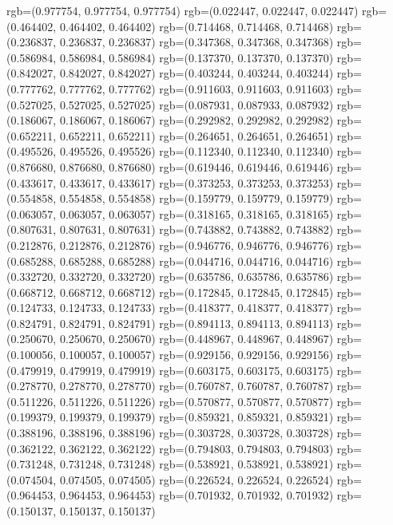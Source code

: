 {{{					rgb=(0.977754, 0.977754, 0.977754)
					rgb=(0.022447, 0.022447, 0.022447)
					rgb=(0.464402, 0.464402, 0.464402)
					rgb=(0.714468, 0.714468, 0.714468)
					rgb=(0.236837, 0.236837, 0.236837)
					rgb=(0.347368, 0.347368, 0.347368)
					rgb=(0.586984, 0.586984, 0.586984)
					rgb=(0.137370, 0.137370, 0.137370)
					rgb=(0.842027, 0.842027, 0.842027)
					rgb=(0.403244, 0.403244, 0.403244)
					rgb=(0.777762, 0.777762, 0.777762)
					rgb=(0.911603, 0.911603, 0.911603)
					rgb=(0.527025, 0.527025, 0.527025)
					rgb=(0.087931, 0.087933, 0.087932)
					rgb=(0.186067, 0.186067, 0.186067)
					rgb=(0.292982, 0.292982, 0.292982)
					rgb=(0.652211, 0.652211, 0.652211)
					rgb=(0.264651, 0.264651, 0.264651)
					rgb=(0.495526, 0.495526, 0.495526)
					rgb=(0.112340, 0.112340, 0.112340)
					rgb=(0.876680, 0.876680, 0.876680)
					rgb=(0.619446, 0.619446, 0.619446)
					rgb=(0.433617, 0.433617, 0.433617)
					rgb=(0.373253, 0.373253, 0.373253)
					rgb=(0.554858, 0.554858, 0.554858)
					rgb=(0.159779, 0.159779, 0.159779)
					rgb=(0.063057, 0.063057, 0.063057)
					rgb=(0.318165, 0.318165, 0.318165)
					rgb=(0.807631, 0.807631, 0.807631)
					rgb=(0.743882, 0.743882, 0.743882)
					rgb=(0.212876, 0.212876, 0.212876)
					rgb=(0.946776, 0.946776, 0.946776)
					rgb=(0.685288, 0.685288, 0.685288)
					rgb=(0.044716, 0.044716, 0.044716)
					rgb=(0.332720, 0.332720, 0.332720)
					rgb=(0.635786, 0.635786, 0.635786)
					rgb=(0.668712, 0.668712, 0.668712)
					rgb=(0.172845, 0.172845, 0.172845)
					rgb=(0.124733, 0.124733, 0.124733)
					rgb=(0.418377, 0.418377, 0.418377)
					rgb=(0.824791, 0.824791, 0.824791)
					rgb=(0.894113, 0.894113, 0.894113)
					rgb=(0.250670, 0.250670, 0.250670)
					rgb=(0.448967, 0.448967, 0.448967)
					rgb=(0.100056, 0.100057, 0.100057)
					rgb=(0.929156, 0.929156, 0.929156)
					rgb=(0.479919, 0.479919, 0.479919)
					rgb=(0.603175, 0.603175, 0.603175)
					rgb=(0.278770, 0.278770, 0.278770)
					rgb=(0.760787, 0.760787, 0.760787)
					rgb=(0.511226, 0.511226, 0.511226)
					rgb=(0.570877, 0.570877, 0.570877)
					rgb=(0.199379, 0.199379, 0.199379)
					rgb=(0.859321, 0.859321, 0.859321)
					rgb=(0.388196, 0.388196, 0.388196)
					rgb=(0.303728, 0.303728, 0.303728)
					rgb=(0.362122, 0.362122, 0.362122)
					rgb=(0.794803, 0.794803, 0.794803)
					rgb=(0.731248, 0.731248, 0.731248)
					rgb=(0.538921, 0.538921, 0.538921)
					rgb=(0.074504, 0.074505, 0.074505)
					rgb=(0.226524, 0.226524, 0.226524)
					rgb=(0.964453, 0.964453, 0.964453)
					rgb=(0.701932, 0.701932, 0.701932)
					rgb=(0.150137, 0.150137, 0.150137)
}}}
